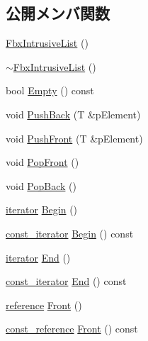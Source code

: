\subsection*{公開メンバ関数}
\begin{DoxyCompactItemize}
\item 
\hyperlink{class_fbx_intrusive_list_a438d0989f5ff6755cd58bec5e85ddaac}{Fbx\+Intrusive\+List} ()
\item 
\hyperlink{class_fbx_intrusive_list_a4528bf939398fb9281478a8faf75891a}{$\sim$\+Fbx\+Intrusive\+List} ()
\item 
bool \hyperlink{class_fbx_intrusive_list_aa2dc68e4cac0bb5ac2e715e3d9d30ef0}{Empty} () const
\item 
void \hyperlink{class_fbx_intrusive_list_a44885493815547ff84cc6650a55defa7}{Push\+Back} (T \&p\+Element)
\item 
void \hyperlink{class_fbx_intrusive_list_a02701251943f1d1f72709954a5c76999}{Push\+Front} (T \&p\+Element)
\item 
void \hyperlink{class_fbx_intrusive_list_ad332103f8b12b341d38115cd1c5cd3ad}{Pop\+Front} ()
\item 
void \hyperlink{class_fbx_intrusive_list_aed150ddaff259ff38993daf555c7a853}{Pop\+Back} ()
\item 
\hyperlink{class_fbx_intrusive_list_ae1012cd86e3ff0a4a49c982f0d34b4e7}{iterator} \hyperlink{class_fbx_intrusive_list_aae6fe870895328f5ec5ec393833faa72}{Begin} ()
\item 
\hyperlink{class_fbx_intrusive_list_a4c0c567c56a712e7ffca9c6bb5990169}{const\+\_\+iterator} \hyperlink{class_fbx_intrusive_list_a6d61be38f14d516be3d5a9e008b95376}{Begin} () const
\item 
\hyperlink{class_fbx_intrusive_list_ae1012cd86e3ff0a4a49c982f0d34b4e7}{iterator} \hyperlink{class_fbx_intrusive_list_aca923b70771ffd74088c8cfc0b70f3da}{End} ()
\item 
\hyperlink{class_fbx_intrusive_list_a4c0c567c56a712e7ffca9c6bb5990169}{const\+\_\+iterator} \hyperlink{class_fbx_intrusive_list_a0d2ee805c1c4c81b8b2ec06f281bb937}{End} () const
\item 
\hyperlink{class_fbx_intrusive_list_aa927f048081371fe74dff673d3a5a8ad}{reference} \hyperlink{class_fbx_intrusive_list_ab7ce2bb2018919a9631c76c2027fbb58}{Front} ()
\item 
\hyperlink{class_fbx_intrusive_list_a21904cb72c0ccae9d5c0b9f171befeb8}{const\+\_\+reference} \hyperlink{class_fbx_intrusive_list_ae823b1f0c9b7fefde5a5957f852d2d98}{Front} () const
\item 

\end{DoxyCompactItemize}
